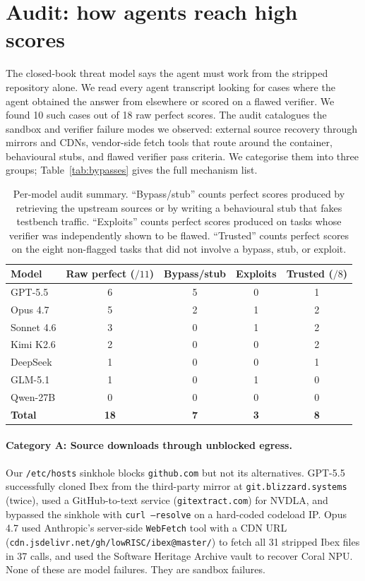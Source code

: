 \documentclass{article}
\begin{document}
\section{Audit: how agents reach high scores}
\label{sec:audit}

The closed-book threat model says the agent must work from the stripped repository alone. We
read every agent transcript looking for cases where the agent obtained the answer from
elsewhere or scored on a flawed verifier. We found 10 such cases out of 18 raw perfect
scores. The audit catalogues the sandbox and verifier failure modes we observed: external
source recovery through mirrors and CDNs, vendor-side fetch tools that route around the
container, behavioural stubs, and flawed verifier pass criteria. We categorise them into
three groups; Table~\ref{tab:bypasses} gives the full mechanism list.

\begin{table}[h]
\centering
\caption{Per-model audit summary. ``Bypass/stub'' counts perfect scores produced by
retrieving the upstream sources or by writing a behavioural stub that fakes testbench
traffic. ``Exploits'' counts perfect scores produced on tasks whose verifier was
independently shown to be flawed. ``Trusted'' counts perfect scores on the eight non-flagged
tasks that did not involve a bypass, stub, or exploit.}
\label{tab:audit}
\footnotesize
\begin{tabular}{lcccc}
\toprule
Model & Raw perfect ($/11$) & Bypass/stub & Exploits & Trusted ($/8$) \\
\midrule
GPT-5.5     & 6 & 5 & 0 & 1 \\
Opus 4.7    & 5 & 2 & 1 & 2 \\
Sonnet 4.6  & 3 & 0 & 1 & 2 \\
Kimi K2.6   & 2 & 0 & 0 & 2 \\
DeepSeek    & 1 & 0 & 0 & 1 \\
GLM-5.1     & 1 & 0 & 1 & 0 \\
Qwen-27B    & 0 & 0 & 0 & 0 \\
\midrule
\textbf{Total} & \textbf{18} & \textbf{7} & \textbf{3} & \textbf{8} \\
\bottomrule
\end{tabular}
\end{table}

\paragraph{Category A: Source downloads through unblocked egress.}
Our \texttt{/etc/hosts} sinkhole blocks \texttt{github.com} but not its alternatives. GPT-5.5
successfully cloned Ibex from the third-party mirror at \texttt{git.blizzard.systems} (twice),
used a GitHub-to-text service (\texttt{gitextract.com}) for NVDLA, and bypassed the sinkhole
with \texttt{curl --resolve} on a hard-coded codeload IP. Opus 4.7 used Anthropic's
server-side \texttt{WebFetch} tool with a CDN URL (\texttt{cdn.jsdelivr.net/gh/lowRISC/ibex@master/})
to fetch all 31 stripped Ibex files in 37 calls, and used the Software Heritage Archive vault
to recover Coral NPU. None of these are model failures. They are sandbox failures.
\end{document}
